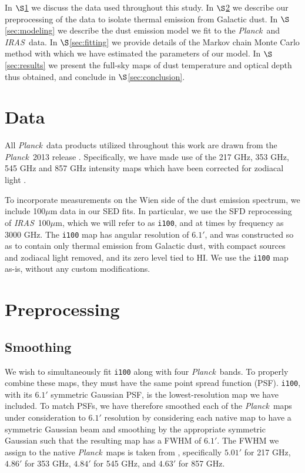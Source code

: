 \documentclass{emulateapj}
\newcommand{\IRAS}{{\it IRAS}}
\newcommand{\PLANCK}{{\it Planck}}
\begin{document}

In $\S$\ref{sec:data} we discuss the data used throughout this study. In 
$\S$\ref{sec:prepro} we describe our preprocessing of the data to isolate 
thermal emission from Galactic dust. In $\S$\ref{sec:modeling} we describe the 
dust emission model we fit to the \PLANCK~and \IRAS~data. In 
$\S$\ref{sec:fitting} we provide details of the Markov chain Monte Carlo method
with which we have estimated the parameters of our model. In 
$\S$\ref{sec:results} we present the full-sky maps of dust temperature and 
optical depth thus obtained, and conclude in $\S$\ref{sec:conclusion}.

 \section{Data}
\label{sec:data}
All \PLANCK~data products utilized throughout this work are drawn from the 
\PLANCK~2013 release \citep{planck2013}. Specifically, we have made use 
of the 217 GHz, 353 GHz, 545 GHz and 857 GHz intensity maps which have been 
corrected for zodiacal light 
\citep[\texttt{R1.10\_nominal\_ZodiCorrected},][]{planckzodi}.

To incorporate measurements on the Wien side of the dust emission spectrum, 
we include 100$\mu$m data in our SED fits. In particular, we use the SFD 
reprocessing of \IRAS~100$\mu$m, which we will refer to as \verb|i100|, and at 
times by frequency as 3000 GHz. The \verb|i100| map has angular resolution of 
$6.1'$, and was constructed so as to contain only thermal 
emission from Galactic dust, with compact sources and zodiacal light removed, 
and its zero level tied to HI. We use the \verb|i100| map as-is, without any 
custom modifications.


\section{Preprocessing}
\label{sec:prepro}

\subsection{Smoothing}
We wish to simultaneously fit \verb|i100| along with four \PLANCK~bands. To 
properly combine these maps, they must have the same point spread function 
(PSF). \verb|i100|, with its $6.1'$ symmetric Gaussian PSF, is the 
lowest-resolution map we have included. To match PSFs, we have therefore 
smoothed each of the \PLANCK~maps under consideration to $6.1'$ resolution by 
considering each native map to have a symmetric Gaussian beam and smoothing by 
the appropriate symmetric Gaussian such that the resulting map has a FWHM of 
$6.1'$. The FWHM we assign to the native \PLANCK~maps is taken from 
\cite{planckbeam}, specifically $5.01'$ for 217 GHz, $4.86'$ for 353 GHz, 
$4.84'$ for 545 GHz, and $4.63'$ for 857 GHz.
\end{document}
